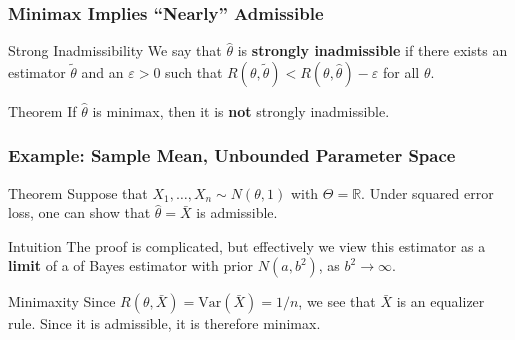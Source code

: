 \begin{frame}
  \frametitle{Minimax Implies ``Nearly'' Admissible}



  \begin{block}{Strong Inadmissibility}
    We say that $\widehat{\theta}$ is \textbf{strongly inadmissible} if there exists an estimator $\widetilde{\theta}$ and an $\varepsilon > 0$ such that $R(\theta, \widetilde{\theta}) < R(\theta, \widehat{\theta}) - \varepsilon$ for all $\theta$.
  \end{block}

  \begin{block}{Theorem}
    If $\widehat{\theta}$ is minimax, then it is \textbf{not} strongly inadmissible.
  \end{block}

\end{frame}

\begin{frame}
  \frametitle{Example: Sample Mean, Unbounded Parameter Space}

  \begin{block}{Theorem}
    Suppose that $X_1, \dots, X_n \sim N(\theta, 1)$ with $\Theta = \mathbb{R}$.
    Under squared error loss, one can show that $\widehat{\theta} = \bar{X}$ is admissible.
  \end{block}

  \begin{block}{Intuition}
    The proof is complicated, but effectively we view this estimator as a \textbf{limit} of a of Bayes estimator with prior $N(a, b^2)$, as $b^2 \rightarrow \infty$.
  \end{block}

  \begin{block}{Minimaxity}
    Since $R(\theta, \bar{X}) = \mbox{Var}(\bar{X}) = 1/n$, we see that $\bar{X}$ is an equalizer rule.
    Since it is admissible, it is therefore minimax.
  \end{block}

\end{frame}

